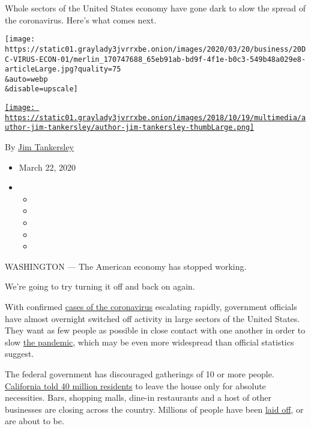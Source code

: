 Whole sectors of the United States economy have gone dark to slow the
spread of the coronavirus. Here's what comes next.

\texttt{[image: https://static01.graylady3jvrrxbe.onion/images/2020/03/20/business/20DC-VIRUS-ECON-01/merlin\_170747688\_65eb91ab-bd9f-4f1e-b0c3-549b48a029e8-articleLarge.jpg?quality=75\\\&auto=webp\\\&disable=upscale]}

\href{https://www.nytimes3xbfgragh.onion/by/jim-tankersley}{\texttt{[image: https://static01.graylady3jvrrxbe.onion/images/2018/10/19/multimedia/author-jim-tankersley/author-jim-tankersley-thumbLarge.png]}}

By \href{https://www.nytimes3xbfgragh.onion/by/jim-tankersley}{Jim
Tankersley}

\begin{itemize}
\item
  March 22, 2020
\item
  \begin{itemize}
  \item
  \item
  \item
  \item
  \item
  \end{itemize}
\end{itemize}

WASHINGTON --- The American economy has stopped working.

We're going to try turning it off and back on again.

With confirmed
\href{https://www.nytimes3xbfgragh.onion/interactive/2020/world/coronavirus-maps.html}{cases
of the coronavirus} escalating rapidly, government officials have almost
overnight switched off activity in large sectors of the United States.
They want as few people as possible in close contact with one another in
order to slow
\href{https://www.nytimes3xbfgragh.onion/news-event/coronavirus}{the
pandemic}, which may be even more widespread than official statistics
suggest.

The federal government has discouraged gatherings of 10 or more people.
\href{https://www.nytimes3xbfgragh.onion/2020/03/19/us/California-stay-at-home-order-virus.html}{California
told 40 million residents} to leave the house only for absolute
necessities. Bars, shopping malls, dine-in restaurants and a host of
other businesses are closing across the country. Millions of people have
been
\href{https://www.nytimes3xbfgragh.onion/2020/03/19/business/economy/coronavirus-employers-unemployment.html}{laid
off}, or are about to be.


